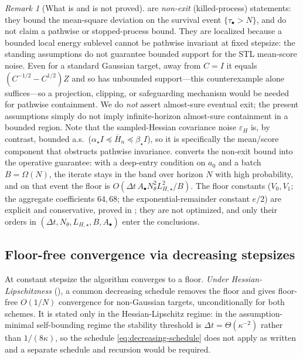 \documentclass[11pt]{article}
\theoremstyle{plain}
\theoremstyle{definition}
\theoremstyle{remark}
\newtheorem{remark}[remark]{Remark}
\newcommand{\Id}{I}
\newcommand{\LHs}{L_{H,\star}}
\begin{document}
\begin{remark}[What is and is not proved]
\label{rem:stoch-local-scope}
 are \emph{non-exit} (killed-process) statements: they
bound the mean-square deviation on the survival event $\{\tau_\bullet>N\}$, and do not claim a
pathwise or stopped-process bound. They are localized because a bounded local energy sublevel cannot
be pathwise invariant at fixed stepsize: the standing assumptions do not guarantee bounded support for
the STL mean-score noise. Even for a standard Gaussian target, away from $C=\Id$ it equals
$(C^{-1/2}-C^{1/2})Z$ and so has unbounded support---this counterexample alone suffices---so a
projection, clipping, or safeguarding mechanism would be needed for pathwise containment. We do \emph{not} assert almost-sure eventual exit; the present assumptions simply do not
imply infinite-horizon almost-sure containment in a bounded region. Note that the sampled-Hessian
covariance noise $\varepsilon_H$ is, by contrast, bounded a.s.\ ($\alpha_\star\Id\preceq\overline H_n\preceq\beta_\star\Id$),
so it is specifically the mean/score component that obstructs pathwise invariance.
 converts the non-exit bound into the operative guarantee: with a deep-entry
condition on $a_0$ and a batch $B=\Omega(N)$, the iterate stays in the band over horizon $N$ with high
probability, and on that event the floor is $O(\Delta t\,A_\bullet N_\theta^2\LHs^2/B)$. The floor
constants ($V_0,V_1$; the aggregate coefficients $64,68$; the exponential-remainder constant $e/2$)
are explicit and conservative, proved in ;
they are not optimized, and only their orders in $(\Delta t,N_\theta,\LHs,B,A_\bullet)$ enter the
conclusions.
\end{remark}

\subsection{Floor-free convergence via decreasing stepsizes}
\label{sec:decreasing}

At constant stepsize the algorithm converges to a floor. \emph{Under Hessian-Lipschitzness}
(), a common decreasing schedule removes the floor and gives floor-free
$O(1/N)$ convergence for non-Gaussian targets, unconditionally for both schemes. It is stated only in
the Hessian-Lipschitz regime: in the assumption-minimal self-bounding regime the stability threshold
is $\Delta t=\Theta(\kappa^{-2})$ rather than $1/(8\kappa)$, so the schedule
\eqref{eq:decreasing-schedule} does not apply as written and a separate schedule and recursion would
be required.
\end{document}
